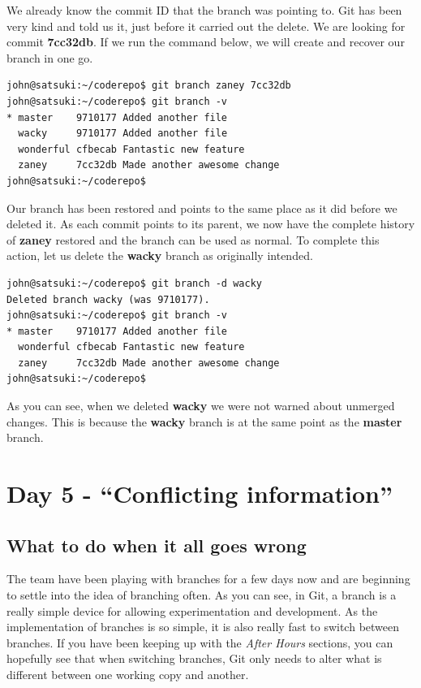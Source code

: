 We already know the commit ID that the branch was pointing to.
Git has been very kind and told us it, just before it carried out the delete.
We are looking for commit \textbf{7cc32db}.
If we run the command below, we will create and recover our branch in one go.

\begin{Verbatim}
john@satsuki:~/coderepo$ git branch zaney 7cc32db
john@satsuki:~/coderepo$ git branch -v
* master    9710177 Added another file
  wacky     9710177 Added another file
  wonderful cfbecab Fantastic new feature
  zaney     7cc32db Made another awesome change
john@satsuki:~/coderepo$
\end{Verbatim}

Our branch has been restored and points to the same place as it did before we deleted it.
As each commit points to its parent, we now have the complete history of \textbf{zaney} restored and the branch can be used as normal.
To complete this action, let us delete the \textbf{wacky} branch as originally intended.

\begin{Verbatim}
john@satsuki:~/coderepo$ git branch -d wacky
Deleted branch wacky (was 9710177).
john@satsuki:~/coderepo$ git branch -v
* master    9710177 Added another file
  wonderful cfbecab Fantastic new feature
  zaney     7cc32db Made another awesome change
john@satsuki:~/coderepo$
\end{Verbatim}

As you can see, when we deleted \textbf{wacky} we were not warned about unmerged changes.
This is because the \textbf{wacky} branch is at the same point as the \textbf{master} branch.

\section{Day 5 - ``Conflicting information''}
\subsection{What to do when it all goes wrong}

The team have been playing with branches for a few days now and are beginning to settle into the idea of branching often.
As you can see, in Git, a branch is a really simple device for allowing experimentation and development.
As the implementation of branches is so simple, it is also really fast to switch between branches.
If you have been keeping up with the \emph{After Hours} sections, you can hopefully see that when switching branches, Git only needs to alter what is different between one working copy and another.

